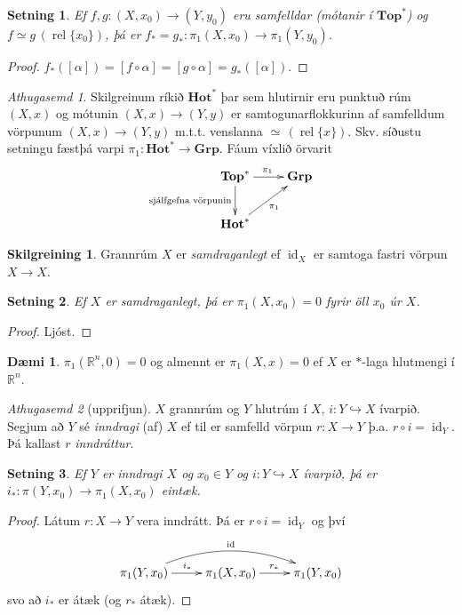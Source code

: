 \documentclass[a4paper,icelandic]{book}
\theoremstyle{definition}
\newtheorem{skilgr}{Skilgreining}[section]
\newtheorem{daemi}{Dæmi}[section]
\theoremstyle{plain}
\newtheorem{setn}{Setning}[section]
\theoremstyle{remark}
\newtheorem*{ath}{Athugasemd}
\newcommand{\R}{\mathbb{R}} %
\DeclareMathOperator{\id}{id} %
\DeclareMathOperator{\rel}{rel}
\newcommand{\prel}[1]{\,\left(\rel #1\right)}
\begin{document}
\begin{setn}
  Ef $f,g:(X,x_0)\to(Y,y_0)$ eru samfelldar (mótanir í $\mathbf{Top}^*$)
  og $f\simeq g \prel{\{x_0\}}$, þá er
  $f_*=g_*:\pi_1(X,x_0)\to\pi_1(Y,y_0)$.
\end{setn}
\begin{proof}
  $f_*([\alpha])=[f\circ\alpha] = [g\circ\alpha] = g_*([\alpha])$.
\end{proof}
\begin{ath}
  Skilgreinum ríkið $\mathbf{Hot}^*$ þar sem hlutirnir eru punktuð rúm
  $(X,x)$ og mótunin $(X,x)\to(Y,y)$ er samtogunarflokkurinn af
  samfelldum vörpunum $(X,x)\to(Y,y)$ m.t.t. venslanna
  $\simeq\prel{\{x\}}$. Skv. síðustu setningu fæstþá varpi
  $\pi_1:\mathbf{Hot}^*\to\mathbf{Grp}$. Fáum víxlið örvarit
  \[
  \xymatrix{
  \mathbf{Top}^*\ar[r]^{\pi_1}\ar[d]_{\text{sjálfgefna vörpunin}}
  & \mathbf{Grp} 
  \\
  \mathbf{Hot}^*\ar[ur]_{\pi_1}
  }
  \]
\end{ath}
\begin{skilgr}
  Grannrúm $X$ er \emph{samdraganlegt} ef $\id_X$
  er samtoga fastri vörpun $X\to X$.
\end{skilgr}
\begin{setn}
  Ef $X$ er samdraganlegt, þá er $\pi_1(X,x_0) = 0$ fyrir öll $x_0$ úr
  $X$.
\end{setn}
\begin{proof}
  Ljóst.
\end{proof}
\begin{daemi}
  $\pi_1(\R^n,0) = 0$ og almennt er $\pi_1(X,x)=0$ ef $X$ er $*$-laga
  hlutmengi í $\R^n$.
\end{daemi}
\begin{ath}[upprifjun]
  $X$ grannrúm og $Y$ hlutrúm í $X$, $i:Y\hookrightarrow X$ ívarpið.
  Segjum að $Y$ sé \emph{inndragi} (af) $X$ ef til er
  samfelld vörpun $r: X\to Y$ þ.a. $r\circ i = \id_Y$. Þá kallast $r$
  \emph{inndráttur}.
\end{ath}
\begin{setn}
  Ef $Y$ er inndragi $X$ og $x_0\in Y$ og $i:Y\hookrightarrow X$
  ívarpið, þá er $i_*:\pi(Y,x_0)\to\pi_1(X,x_0)$ eintæk.
\end{setn}
\begin{proof}
  Látum $r:X\to Y$ vera inndrátt. Þá er $r\circ i = \id_Y$ og því 
  \[
  \xymatrix{
  \pi_1(Y,x_0)  \ar[r]^{i_*}\ar@/^1.5pc/[rr]^{\id}
  & \pi_1(X,x_0)\ar[r]^{r_*}
  & \pi_1(Y,x_0)
  }
  \]
  svo að $i_*$ er átæk (og $r_*$ átæk).
\end{proof}
\end{document}
